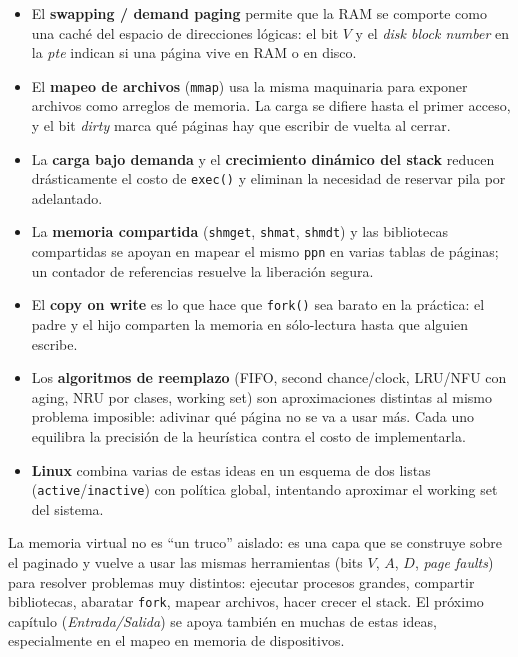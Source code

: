 \documentclass[11pt,a4paper]{article}
\begin{document}
\begin{itemize}[leftmargin=*]
    \item El \textbf{swapping / demand paging} permite que la RAM se
        comporte como una caché del espacio de direcciones lógicas: el
        bit $V$ y el \emph{disk block number} en la \emph{pte} indican
        si una página vive en RAM o en disco.
    \item El \textbf{mapeo de archivos} (\texttt{mmap}) usa la misma
        maquinaria para exponer archivos como arreglos de memoria. La
        carga se difiere hasta el primer acceso, y el bit \emph{dirty}
        marca qué páginas hay que escribir de vuelta al cerrar.
    \item La \textbf{carga bajo demanda} y el \textbf{crecimiento
        dinámico del stack} reducen drásticamente el costo de
        \texttt{exec()} y eliminan la necesidad de reservar pila por
        adelantado.
    \item La \textbf{memoria compartida} (\texttt{shmget}, \texttt{shmat},
        \texttt{shmdt}) y las bibliotecas compartidas se apoyan en
        mapear el mismo \texttt{ppn} en varias tablas de páginas; un
        contador de referencias resuelve la liberación segura.
    \item El \textbf{copy on write} es lo que hace que \texttt{fork()}
        sea barato en la práctica: el padre y el hijo comparten la
        memoria en sólo-lectura hasta que alguien escribe.
    \item Los \textbf{algoritmos de reemplazo} (FIFO, second
        chance/clock, LRU/NFU con aging, NRU por clases, working set)
        son aproximaciones distintas al mismo problema imposible:
        adivinar qué página no se va a usar más. Cada uno equilibra la
        precisión de la heurística contra el costo de implementarla.
    \item \textbf{Linux} combina varias de estas ideas en un esquema de
        dos listas (\texttt{active}/\texttt{inactive}) con política
        global, intentando aproximar el working set del sistema.
\end{itemize}

\begin{idea}
La memoria virtual no es ``un truco'' aislado: es una capa que se
construye sobre el paginado y vuelve a usar las mismas herramientas
(bits $V$, $A$, $D$, \emph{page faults}) para resolver problemas muy
distintos: ejecutar procesos grandes, compartir bibliotecas, abaratar
\texttt{fork}, mapear archivos, hacer crecer el stack. El próximo
capítulo (\emph{Entrada/Salida}) se apoya también en muchas de estas
ideas, especialmente en el mapeo en memoria de dispositivos.
\end{idea}
\end{document}
